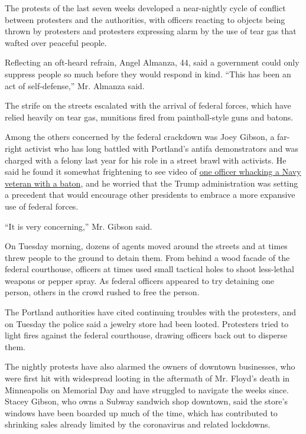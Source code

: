 The protests of the last seven weeks developed a near-nightly cycle of
conflict between protesters and the authorities, with officers reacting
to objects being thrown by protesters and protesters expressing alarm by
the use of tear gas that wafted over peaceful people.

Reflecting an oft-heard refrain, Angel Almanza, 44, said a government
could only suppress people so much before they would respond in kind.
``This has been an act of self-defense,'' Mr. Almanza said.

The strife on the streets escalated with the arrival of federal forces,
which have relied heavily on tear gas, munitions fired from
paintball-style guns and batons.

Among the others concerned by the federal crackdown was Joey Gibson, a
far-right activist who has long battled with Portland's antifa
demonstrators and was charged with a felony last year for his role in a
street brawl with activists. He said he found it somewhat frightening to
see video of
\href{https://www.nytimes.com/2020/07/20/us/portland-protests-navy-christopher-david.html}{one
officer whacking a Navy veteran with a baton}, and he worried that the
Trump administration was setting a precedent that would encourage other
presidents to embrace a more expansive use of federal forces.

``It is very concerning,'' Mr. Gibson said.

On Tuesday morning, dozens of agents moved around the streets and at
times threw people to the ground to detain them. From behind a wood
facade of the federal courthouse, officers at times used small tactical
holes to shoot less-lethal weapons or pepper spray. As federal officers
appeared to try detaining one person, others in the crowd rushed to free
the person.

The Portland authorities have cited continuing troubles with the
protesters, and on Tuesday the police said a jewelry store had been
looted. Protesters tried to light fires against the federal courthouse,
drawing officers back out to disperse them.

The nightly protests have also alarmed the owners of downtown
businesses, who were first hit with widespread looting in the aftermath
of Mr. Floyd's death in Minneapolis on Memorial Day and have struggled
to navigate the weeks since. Stacey Gibson, who owns a Subway sandwich
shop downtown, said the store's windows have been boarded up much of the
time, which has contributed to shrinking sales already limited by the
coronavirus and related lockdowns.

